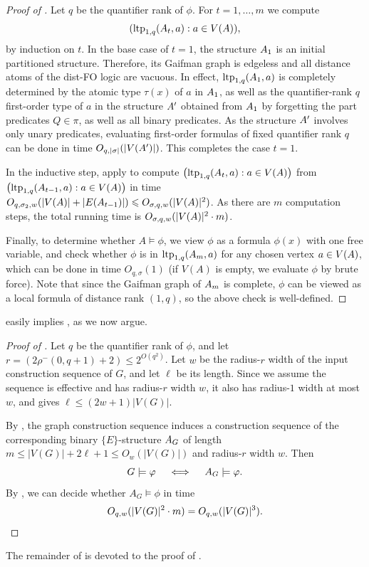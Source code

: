 \begin{proof}[Proof of ]
   Let $q$ be the quantifier rank of $\phi$.
For  $t=1,\ldots,m$ we compute
$$(\textnormal{ltp}_{1,q}({{A}}_t,a):a\in V({{A}})),$$
by induction on $t$.
In the base case of $t=1$, the structure ${{A}}_1$ is an initial partitioned structure.
  Therefore, its Gaifman graph is edgeless and all distance atoms of the dist-FO logic are vacuous.
  In effect, $\textnormal{ltp}_{1,q}({{A}}_1,a)$ is completely determined by the
  atomic type $\tau(x)$ of $a$ in ${{A}}_1$,
as well as the  quantifier-rank $q$ first-order type of $a$ in the structure ${{A}}'$ obtained from ${{A}}_1$ by forgetting the part predicates $Q\in\pi$, as well as all binary predicates. As the structure ${{A}}'$ involves only unary predicates,
evaluating first-order formulas of fixed quantifier rank $q$ can be done in time $O_{q,|\sigma|}(|V({{A}}')|)$.
This completes the case $t=1$.

In the inductive step,
apply  to compute $\bigl(\textnormal{ltp}_{1,q}({{A}}_t,a):a\in V({{A}})\bigr)$ from $\bigl(\textnormal{ltp}_{1,q}({{A}}_{t-1},a):a\in V({{A}})\bigr)$ in time $O_{q,\sigma_2,w}(|V({{A}})|+|E({{A}}_{t-1})|)\leqslant O_{\sigma,q,w}(|V({{A}})|^2)$. As there are $m$ computation steps, the total running time is $O_{\sigma,q,w}(|V({{A}})|^2\cdot m)$.

Finally, to determine whether $A\models\phi$,
we view $\phi$ as a formula $\phi(x)$ with one free variable, and check whether $\phi$ is in $\textnormal{ltp}_{1,q}({{A}}_m,a)$ for any chosen vertex $a\in V({{A}})$, which can be done in time $O_{q,\sigma}(1)$
 (if $V(A)$ is empty, we evaluate $\phi$ by brute force).
Note that since the Gaifman graph of ${{A}}_m$ is complete, $\phi$ can be viewed as a local \distFO formula of distance rank $(1,q)$, so the above check is well-defined.
\end{proof}

  easily implies , as we now argue.
\begin{proof}[Proof of ]
  Let \(q\) be the quantifier rank of \(\phi\), and let $r=(2\rho^-(0,q+1)+2)\le 2^{O(q^2)}$. 
  Let $w$ be the radius-\(r\) width of the input construction sequence of $G$, and 
let \(\ell\) be its length.
  Since we assume the sequence is effective and has radius-\(r\) width \(w\), it also
  has radius-\(1\) width at most \(w\), and 
  gives \(\ell\le (2w+1)|V(G)|\).

  By , the graph construction sequence
  induces a construction sequence of the corresponding binary \(\{E\}\)-structure
  \({{A}}_G\) of length \(m\le |V(G)|+2\ell+1\le O_w(|V(G)|)\) and radius-\(r\) width $w$.
  Then
  \[
      G\models\varphi \quad\iff\quad {{A}}_G\models\varphi.
  \]
  By , we can decide whether \(A_G\models\phi\) in time
  \[
      O_{q,w}(|V(G)|^2\cdot m)=O_{q,w}(|V(G)|^3).\qedhere
  \]
\end{proof}
The remainder of  is devoted to the proof of .

